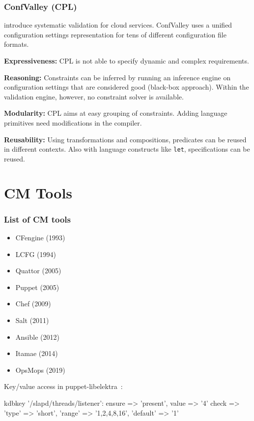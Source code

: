 \begin{frame}
	\frametitle{ConfValley (CPL)}

	\citet{huang2015confvalley} introduce systematic validation for cloud services.
	ConfValley uses a unified configuration settings representation for tens of different configuration file formats.

	\textbf{Expressiveness:}
	CPL is not able to specify dynamic and complex requirements.

	\textbf{Reasoning:}
	Constraints can be inferred by running an inference engine on configuration settings that are considered good (black-box approach).
	Within the validation engine, however, no constraint solver is available.

	\textbf{Modularity:}
	CPL aims at easy grouping of constraints.
	Adding language primitives need modifications in the compiler.

	\textbf{Reusability:}
	Using transformations and compositions, predicates can be reused in different contexts.
	Also with language constructs like \texttt{let}, specifications can be reused.
\end{frame}




\section{CM Tools}

\begin{frame}
	\frametitle{List of CM tools}

	\begin{itemize}[<+-| alert@+>]
	\item CFengine (1993)
	\item LCFG (1994)
	\item Quattor (2005)
	\item Puppet (2005)
	\item Chef (2009)
	\item Salt (2011)
	\item Ansible (2012)
	\item Itamae (2014)
	\item OpsMops (2019)
	\end{itemize}
\end{frame}

\begin{frame}[fragile]
	Key/value access in puppet-libelektra~\cite{raab2020unified}:
	\vspace{0.5cm}

	\begin{code}[morekeywords={kdbkey,kdbmount,ensure,value},gobble=4]
	kdbkey {'/slapd/threads/listener':
		ensure => 'present',
		value => '4'
		check => {
			'type' => 'short',
			'range' => '1,2,4,8,16',
			'default' => '1'
		}
	}
	\end{code}
\end{frame}

